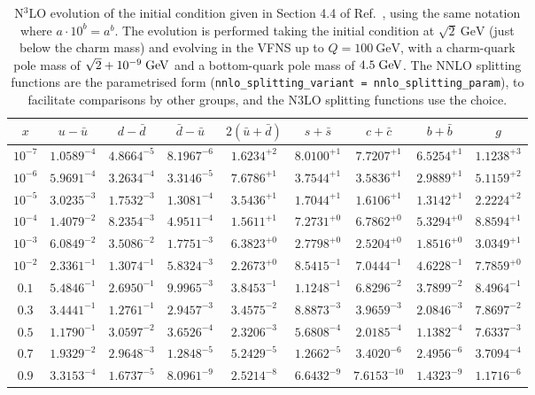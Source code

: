 \begin{table}[ht!]
  \label{tab:n3lo-evolve}
  \small \centering
  \begin{tabular}{c|cccccccc}
    $x$ &  $u-\bar u$ &$d-\bar d$ &$\bar d-\bar u$ &  $ 2(\bar u+\bar d)$  &$s+\bar s$&$c+\bar c$ &$b+\bar b$  &   $g$\\
    \toprule
$10^{-7}$ &  $1.0589^{-4}$ &  $4.8664^{-5}$ &  $8.1967^{-6}$ &  $1.6234^{+2}$ &  $8.0100^{+1}$ &  $7.7207^{+1}$ &  $6.5254^{+1}$ &  $1.1238^{+3}$ \\
$10^{-6}$ &  $5.9691^{-4}$ &  $3.2634^{-4}$ &  $3.3146^{-5}$ &  $7.6786^{+1}$ &  $3.7544^{+1}$ &  $3.5836^{+1}$ &  $2.9889^{+1}$ &  $5.1159^{+2}$ \\
$10^{-5}$ &  $3.0235^{-3}$ &  $1.7532^{-3}$ &  $1.3081^{-4}$ &  $3.5436^{+1}$ &  $1.7044^{+1}$ &  $1.6106^{+1}$ &  $1.3142^{+1}$ &  $2.2224^{+2}$ \\
$10^{-4}$ &  $1.4079^{-2}$ &  $8.2354^{-3}$ &  $4.9511^{-4}$ &  $1.5611^{+1}$ &  $7.2731^{+0}$ &  $6.7862^{+0}$ &  $5.3294^{+0}$ &  $8.8594^{+1}$ \\
$10^{-3}$ &  $6.0849^{-2}$ &  $3.5086^{-2}$ &  $1.7751^{-3}$ &  $6.3823^{+0}$ &  $2.7798^{+0}$ &  $2.5204^{+0}$ &  $1.8516^{+0}$ &  $3.0349^{+1}$ \\
$10^{-2}$ &  $2.3361^{-1}$ &  $1.3074^{-1}$ &  $5.8324^{-3}$ &  $2.2673^{+0}$ &  $8.5415^{-1}$ &  $7.0444^{-1}$ &  $4.6228^{-1}$ &  $7.7859^{+0}$ \\
$0.1$    &  $5.4846^{-1}$ &  $2.6950^{-1}$ &  $9.9965^{-3}$ &  $3.8453^{-1}$ &  $1.1248^{-1}$ &  $6.8296^{-2}$ &  $3.7899^{-2}$ &  $8.4964^{-1}$ \\
$0.3$    &  $3.4441^{-1}$ &  $1.2761^{-1}$ &  $2.9457^{-3}$ &  $3.4575^{-2}$ &  $8.8873^{-3}$ &  $3.9659^{-3}$ &  $2.0846^{-3}$ &  $7.8697^{-2}$ \\
$0.5$    &  $1.1790^{-1}$ &  $3.0597^{-2}$ &  $3.6526^{-4}$ &  $2.3206^{-3}$ &  $5.6808^{-4}$ &  $2.0185^{-4}$ &  $1.1382^{-4}$ &  $7.6337^{-3}$ \\
$0.7$    &  $1.9329^{-2}$ &  $2.9648^{-3}$ &  $1.2848^{-5}$ &  $5.2429^{-5}$ &  $1.2662^{-5}$ &  $3.4020^{-6}$ &  $2.4956^{-6}$ &  $3.7094^{-4}$ \\
$0.9$    &  $3.3153^{-4}$ &  $1.6737^{-5}$ &  $8.0961^{-9}$ &  $2.5214^{-8}$ &  $6.6432^{-9}$ &  $7.6153^{-10}$ &  $1.4323^{-9}$ &  $1.1716^{-6}$ 
  \end{tabular}
  \caption{N$^3$LO evolution of the initial condition given in Section
    4.4 of Ref.~\cite{Dittmar:2005ed}, using the same notation where
    $a\cdot10^{b} = a^b$. The evolution is performed taking the
    initial condition at $\sqrt{2}~\text{GeV}$ (just below the charm
    mass) and evolving in the VFNS up to $Q=100~\text{GeV}$, with a
    charm-quark pole mass of $\sqrt{2}+10^{-9}\;\mathrm{GeV}$ and a bottom-quark
    pole mass of $4.5\;\mathrm{GeV}$.
    The NNLO splitting functions are the parametrised form
    (\texttt{nnlo\_splitting\_variant = nnlo\_splitting\_param}), to 
    facilitate comparisons by other groups, and the N3LO splitting
    functions use the
     choice.}
\end{table}
  
